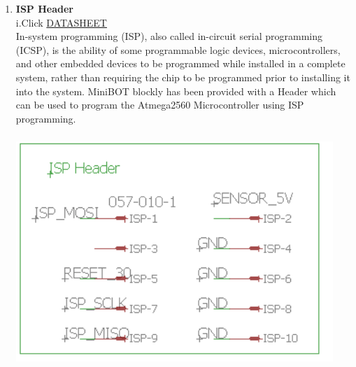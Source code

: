 \documentclass[a4paper,12pt,oneside]{book}
\begin{document}
\begin{enumerate}
    \newpage\item \textbf{ISP Header}\\
    i.Click \href{http://www.cs.ou.edu/~fagg/classes/general/atmel/avrisp_ug.pdf}{DATASHEET}
    \\In-system programming (ISP), also called in-circuit serial programming (ICSP), is the ability of some programmable logic devices, microcontrollers, and other embedded devices to be programmed while installed in a complete system, rather than requiring the chip to be programmed prior to installing it into the system.
    MiniBOT blockly has been provided with a Header which can be used to program the Atmega2560 Microcontroller using ISP programming.
    \vspace*{1.5cm}
    \\\hspace*{.5cm}\includegraphics[width=12cm, height=9.5cm]{isp}
    

\end{enumerate}
\end{document}
